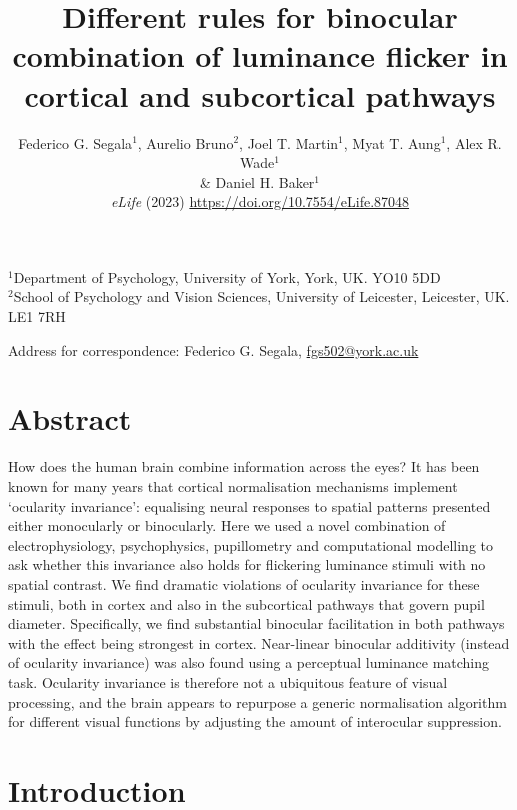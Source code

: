 \documentclass[
]{article}
\title{Different rules for binocular combination of luminance flicker in cortical and subcortical pathways}
\author{Federico G. Segala\(^1\), Aurelio Bruno\(^2\), Joel T. Martin\(^1\), Myat T. Aung\(^1\), Alex R. Wade\(^1\)\\
\& Daniel H. Baker\(^1\)\\
\emph{eLife} (2023) \url{https://doi.org/10.7554/eLife.87048}}
\date{}
\begin{document}
\maketitle

\(^1\)Department of Psychology, University of York, York, UK. YO10 5DD\\
\(^2\)School of Psychology and Vision Sciences, University of Leicester, Leicester, UK. LE1 7RH

Address for correspondence: Federico G. Segala, \url{fgs502@york.ac.uk}

\hypertarget{abstract}{%
\section{Abstract}\label{abstract}}

How does the human brain combine information across the eyes? It has been known for many years that cortical normalisation mechanisms implement `ocularity invariance': equalising neural responses to spatial patterns presented either monocularly or binocularly. Here we used a novel combination of electrophysiology, psychophysics, pupillometry and computational modelling to ask whether this invariance also holds for flickering luminance stimuli with no spatial contrast. We find dramatic violations of ocularity invariance for these stimuli, both in cortex and also in the subcortical pathways that govern pupil diameter. Specifically, we find substantial binocular facilitation in both pathways with the effect being strongest in cortex. Near-linear binocular additivity (instead of ocularity invariance) was also found using a perceptual luminance matching task. Ocularity invariance is therefore not a ubiquitous feature of visual processing, and the brain appears to repurpose a generic normalisation algorithm for different visual functions by adjusting the amount of interocular suppression.

\hypertarget{introduction}{%
\section{Introduction}\label{introduction}}
\end{document}
